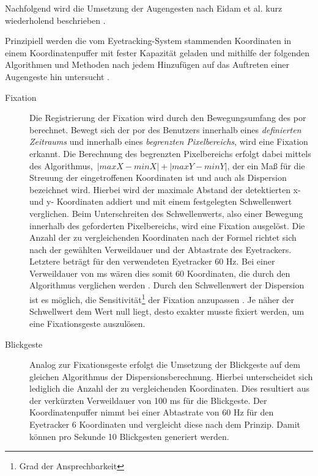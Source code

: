 Nachfolgend wird die Umsetzung der Augengesten nach Eidam et al. kurz wiederholend beschrieben \cite{Eidam2016,Eidam2015}.

Prinzipiell werden die vom Eyetracking-System stammenden Koordinaten in einem Koordinatenpuffer mit fester Kapazität geladen und mithilfe der folgenden Algorithmen und Methoden nach jedem Hinzufügen auf das Auftreten einer Augengeste hin untersucht \cite{Eidam2015}. 

\begin{description}
\item[Fixation] Die Registrierung der Fixation wird durch den Bewegungsumfang des \acs{por} berechnet. Bewegt sich der \acs{por} des Benutzers innerhalb eines \textit{definierten Zeitraums} und innerhalb eines \textit{begrenzten Pixelbereichs}, wird eine Fixation erkannt. Die Berechnung des begrenzten Pixelbereichs erfolgt dabei mittels des Algorithmus,~\(|maxX-minX|+|maxY-minY|\), der ein Maß für die Streuung der eingetroffenen Koordinaten ist und auch als Dispersion bezeichnet wird. Hierbei wird der maximale Abstand der detektierten x- und y- Koordinaten addiert und mit einem festgelegten Schwellenwert verglichen. Beim Unterschreiten des Schwellenwerts, also einer Bewegung innerhalb des geforderten Pixelbereichs, wird eine Fixation ausgelöst.
Die Anzahl der zu vergleichenden Koordinaten nach der \og Formel richtet sich nach der gewählten Verweildauer und der Abtastrate des Eyetrackers. Letztere beträgt für den verwendeten Eyetracker 60 Hz. Bei einer Verweildauer von  ms wären dies somit 60 Koordinaten, die durch den \og Algorithmus verglichen werden \cite{Eidam2015}. Durch den Schwellenwert der Dispersion ist es möglich, die Sensitivität\footnote{Grad der Ansprechbarkeit} der Fixation anzupassen \cite[S.295]{SMI2011}. Je näher der Schwellwert dem Wert null liegt, desto exakter musste fixiert werden, um eine Fixationsgeste auszulösen.

\item[Blickgeste] Analog zur Fixationsgeste erfolgt die Umsetzung der Blickgeste auf dem gleichen \og Algorithmus der Dispersionsberechnung. Hierbei unterscheidet sich lediglich die Anzahl der zu vergleichenden Koordinaten. Dies resultiert aus der verkürzten Verweildauer von 100 ms für die Blickgeste. Der Koordinatenpuffer nimmt bei einer Abtastrate von 60 Hz für den Eyetracker 6 Koordinaten und vergleicht diese nach dem \og Prinzip. Damit können pro Sekunde 10 Blickgesten generiert werden.


\end{description}
